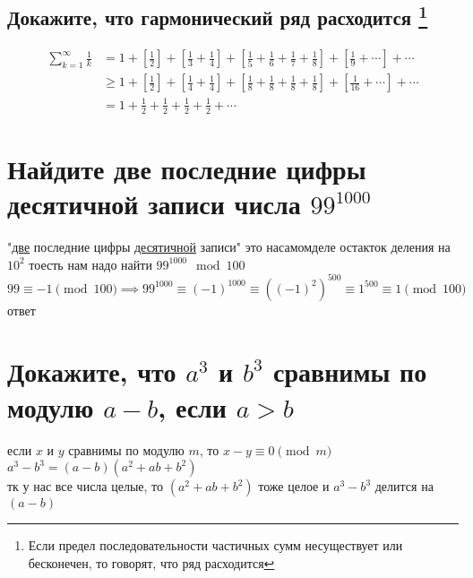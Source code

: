 \documentclass{article}
\newcommand{\Mod}[1]{\pmod{#1}}
\begin{document}
  \subsection{Докажите, что гармонический ряд расходится \protect\footnote{Если предел последовательности частичных сумм несуществует или бесконечен, то говорят, что ряд расходится}}
  \begin{align*}
  \sum_{k=1}^\infty \frac{1}{k}
  & = 1 + \left[\frac{1}{2}\right] + \left[\frac{1}{3} + \frac{1}{4}\right]
  + \left[\frac{1}{5} + \frac{1}{6} + \frac{1}{7} + \frac{1}{8}\right] + \left[\frac{1}{9}+\cdots\right] +\cdots \\
  & \geq 1 + \left[\frac{1}{2}\right] + \left[\frac{1}{4} + \frac{1}{4}\right]
  + \left[\frac{1}{8} + \frac{1}{8} + \frac{1}{8} + \frac{1}{8}\right] + \left[\frac{1}{16}+\cdots\right] +\cdots \\
  & = 1 + \frac{1}{2} + \frac{1}{2} + \frac{1}{2} + \frac{1}{2} + \cdots
  \end{align*}
  \vspace{1cm} %

  \section{Найдите две последние цифры десятичной записи числа $99^{1000}$}
  "\underline{две} последние цифры \underline{десятичной} записи"{}
  это насамомделе остакток деления на $10^2$ тоесть нам надо найти $99^{1000} \mod{100}$ \\
  $99 \equiv -1 \Mod{100} \implies 99^{1000} \equiv (-1)^{1000} \equiv \left((-1)^2\right)^{500} \equiv 1^{500} \equiv 1 \Mod{100}$ \\
  ответ 

  \section{Докажите, что $a^3$ и $b^3$ сравнимы по модулю $a-b$, если $a>b$}
  если $x$ и $y$ сравнимы по модулю $m$, то $x-y \equiv 0 \Mod{m}$ \\
  $a^3 - b^3 = (a-b)(a^2+ab+b^2)$ \\
  тк у нас все числа целые, то $(a^2+ab+b^2)$ тоже целое и $a^3 - b^3$ делится на $(a-b)$
\end{document}
